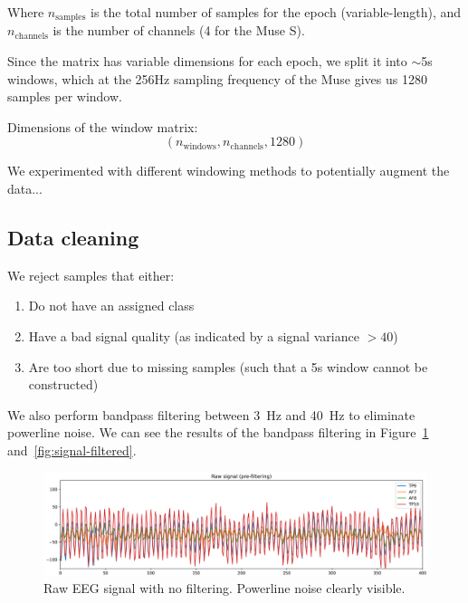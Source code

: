         Where $n_{\mathrm{samples}}$ is the total number of samples for the epoch (variable-length), and $n_{\mathrm{channels}}$ is the number of channels (4 for the Muse S).

        Since the matrix has variable dimensions for each epoch, we split it into $\sim$5s windows, which at the 256Hz sampling frequency of the Muse gives us 1280 samples per window.

        Dimensions of the window matrix: \[ (n_{\mathrm{windows}}, n_{\mathrm{channels}}, 1280) \]

        We experimented with different windowing methods to potentially augment the data...  

    \subsection{Data cleaning}

        We reject samples that either:

        \begin{enumerate}
            \item Do not have an assigned class
            \item Have a bad signal quality (as indicated by a signal variance $>40$)
            \item Are too short due to missing samples (such that a 5s window cannot be constructed)
        \end{enumerate}



        We also perform bandpass filtering between \SI{3}{\hertz} and \SI{40}{\hertz} to eliminate powerline noise. We can see the results of the bandpass filtering in Figure~\ref{fig:signal-unfiltered} and~\ref{fig:signal-filtered}.

        \begin{figure}[h]
            \includegraphics[width=14cm]{img/raw-signal-prefilter.png}
            \caption{Raw EEG signal with no filtering. Powerline noise clearly visible.}\label{fig:signal-unfiltered}
        \end{figure}

